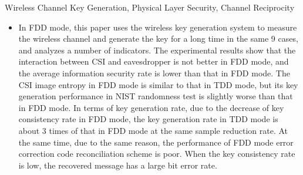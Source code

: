 \documentclass[master]{seuthesis} %
\begin{document}
\begin{englishabstract}{Wireless Channel Key Generation, Physical Layer Security, Channel Reciprocity}
\begin{itemize}
        \item In FDD mode, this paper uses the wireless key generation system to measure the wireless channel and generate the key for a long time in the same 9 cases, and analyzes a number of indicators. The experimental results show that the interaction between CSI and eavesdropper is not better in FDD mode, and the average information security rate is lower than that in FDD mode. The CSI image entropy in FDD mode is similar to that in TDD mode, but its key generation performance in NIST randomness test is slightly worse than that in FDD mode. In terms of key generation rate, due to the decrease of key consistency rate in FDD mode, the key generation rate in TDD mode is about 3 times of that in FDD mode at the same sample reduction rate. At the same time, due to the same reason, the performance of FDD mode error correction code reconciliation scheme is poor. When the key consistency rate is low, the recovered message has a large bit error rate.
    \end{itemize}
    \quad %
    \end{englishabstract}

\tableofcontents





\end{document}

